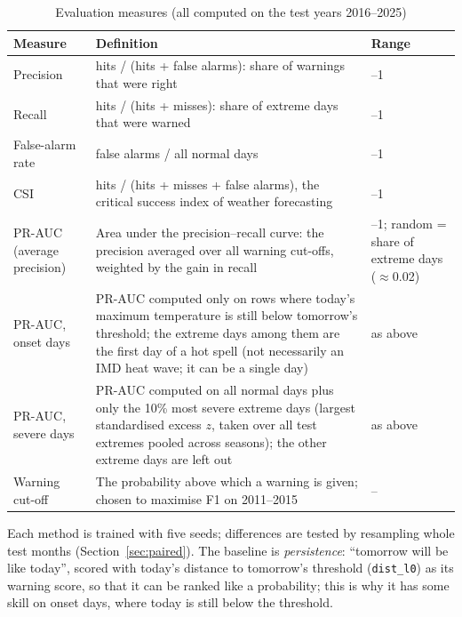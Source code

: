 \documentclass[12pt,a4paper]{report}
\begin{document}
\begin{table}[H]
\centering
\caption{Evaluation measures (all computed on the test years 2016--2025)}
\label{tab:metrics}
\footnotesize
\begin{tabularx}{\textwidth}{|>{\raggedright\arraybackslash}p{3.0cm}|X|>{\raggedright\arraybackslash}p{2.6cm}|}
\hline
\textbf{Measure} & \textbf{Definition} & \textbf{Range}\\ \hline
Precision & hits / (hits + false alarms): share of warnings that were right & 0--1 \\ \hline
Recall & hits / (hits + misses): share of extreme days that were warned & 0--1 \\ \hline
False-alarm rate & false alarms / all normal days & 0--1 \\ \hline
CSI & hits / (hits + misses + false alarms), the critical success index of weather forecasting & 0--1 \\ \hline
PR-AUC (average precision) & Area under the precision--recall curve: the precision averaged over all warning cut-offs,
  weighted by the gain in recall & 0--1; random = share of extreme days ($\approx$0.02) \\ \hline
PR-AUC, onset days & PR-AUC computed only on rows where today's maximum temperature is still below tomorrow's threshold; the extreme days among them are the first day of a hot spell (not necessarily an IMD heat wave; it can be a single day) & as above \\ \hline
PR-AUC, severe days & PR-AUC computed on all normal days plus only the 10\% most severe extreme days (largest standardised excess $z$, taken over all test extremes pooled across seasons); the other extreme days are left out & as above \\ \hline
Warning cut-off & The probability above which a warning is given; chosen to maximise F1 on 2011--2015 & -- \\ \hline
\end{tabularx}
\end{table} Each method is trained with five seeds;
differences are tested by resampling whole test months (Section~\ref{sec:paired}). The baseline is
\emph{persistence}: ``tomorrow will be like today'', scored with today's distance to tomorrow's threshold
(\texttt{dist\_l0}) as its warning score, so that it can be ranked like a probability; this is why it has some skill on
onset days, where today is still below the threshold.
\end{document}
